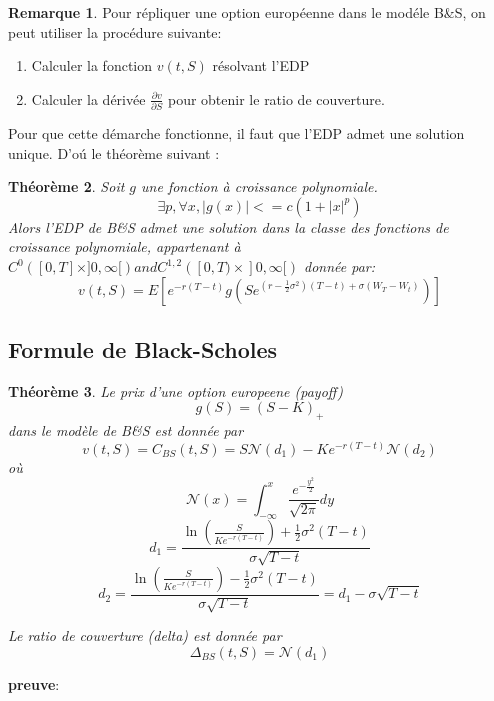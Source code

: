 \documentclass{article}
\theoremstyle{plain}
\newtheorem{thm}{Th\'eor\`eme}[section]
\theoremstyle{definition}
\newtheorem{remq}[thm]{Remarque}
\begin{document}
\begin{remq}
	Pour r\'epliquer une option europ\'eenne dans le mod\'ele B\&S, on peut utiliser la proc\'edure suivante:
\end{remq}
\begin{enumerate}
\item Calculer la fonction $v(t,S)$ r\'esolvant l'EDP

\item Calculer la d\'eriv\'ee $\frac{\partial v}{\partial S}$ pour obtenir le ratio de couverture.
\end{enumerate}

Pour que cette d\'emarche fonctionne, il faut que l'EDP admet une solution unique. D'o\'u le th\'eor\`eme suivant :

\begin{thm}
	Soit $g$ une fonction \`a croissance polynomiale.
\begin{equation}
\exists p, \forall x, |g(x)|<=c(1+|x|^p)
\end{equation}
Alors l'EDP de B\&S admet une solution dans la classe des fonctions de croissance polynomiale, appartenant \`a $C^0([0,T]\times ]0,\infty[) and C^{1,2}([0,T)\times]0,\infty[)$ donn\'ee par:
\begin{equation}
v(t,S)=E[e^{-r(T-t)}g(Se^{(r-\frac{1}{2}\sigma^2)(T-t)+\sigma (W_T -W_t)})]
\end{equation}
\end{thm}


\subsection{Formule de Black-Scholes}
\begin{thm}
	Le prix d'une option europeene (payoff)
\begin{equation}
g(S)=(S-K)_+
\end{equation}
dans le mod\`ele de B\&S est donn\'ee par
\begin{equation}
v(t,S)=C_{BS}(t,S)=S\mathcal{N}(d_1)-K e^{-r(T-t)}\mathcal{N}(d_2)
\end{equation}
o\`u
\begin{equation}
\mathcal{N}(x)=\int_{-\infty}^x \frac{e^{-\frac{y^2}{2}}}{\sqrt{2\pi}}dy
\end{equation}
\begin{equation}
d_1=\frac{\ln(\frac{S}{Ke^{-r(T-t)}})+\frac{1}{2}\sigma^2(T-t)}{\sigma \sqrt{T-t}}
\end{equation}
\begin{equation}
d_2=\frac{\ln(\frac{S}{Ke^{-r(T-t)}})-\frac{1}{2}\sigma^2(T-t)}{\sigma\sqrt{T-t}}=d_1-\sigma\sqrt{T-t}
\end{equation}

Le ratio de couverture (delta) est donn\'ee par
\begin{equation}
\Delta_{BS}(t,S)=\mathcal{N}(d_1)
\end{equation}

\end{thm}
\textbf{preuve}:
\end{document}
